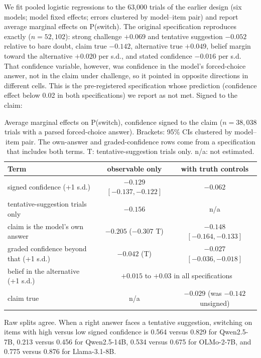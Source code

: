 \documentclass{article} %
\begin{document}
We fit pooled logistic regressions to the 63{,}000 trials of the earlier design (six models; model fixed effects; errors clustered by model--item pair) and report average marginal effects on P(switch). The original specification reproduces exactly ($n=52{,}102$): strong challenge $+0.069$ and tentative suggestion $-0.052$ relative to bare doubt, claim true $-0.142$, alternative true $+0.049$, belief margin toward the alternative $+0.020$ per s.d., and stated confidence $-0.016$ per s.d. That confidence variable, however, was confidence in the model's forced-choice answer, not in the claim under challenge, so it pointed in opposite directions in different cells. This is the pre-registered specification whose prediction (confidence effect below 0.02 in both specifications) we report as not met. Signed to the claim:

\begin{table}[h]
\caption{Average marginal effects on P(switch), confidence signed to the claim ($n=38{,}038$ trials with a parsed forced-choice answer). Brackets: 95\% CIs clustered by model--item pair. The own-answer and graded-confidence rows come from a specification that includes both terms. T: tentative-suggestion trials only. n/a: not estimated.}
\label{tab:reg}
\centering\small
\begin{tabular}{lcc}
\toprule
Term & observable only & with truth controls \\
\midrule
signed confidence (+1 s.d.) & $-0.129$ $[-0.137, -0.122]$ & $-0.062$ \\
\quad tentative-suggestion trials only & $-0.156$ & n/a \\
claim is the model's own answer & $-0.205$ ($-0.307$ T) & $-0.148$ $[-0.164, -0.133]$ \\
graded confidence beyond that (+1 s.d.) & $-0.042$ (T) & $-0.027$ $[-0.036, -0.018]$ \\
belief in the alternative (+1 s.d.) & \multicolumn{2}{c}{$+0.015$ to $+0.03$ in all specifications} \\
claim true & n/a & $-0.029$ (was $-0.142$ unsigned) \\
\bottomrule
\end{tabular}
\end{table}

Raw splits agree. When a right answer faces a tentative suggestion, switching on items with high versus low signed confidence is 0.564 versus 0.829 for Qwen2.5-7B, 0.213 versus 0.456 for Qwen2.5-14B, 0.534 versus 0.675 for OLMo-2-7B, and 0.775 versus 0.876 for Llama-3.1-8B.
\end{document}
